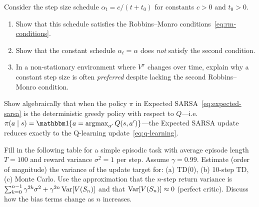 \begin{exercise}
\label{ex:rm-conditions}
Consider the step size schedule $\alpha_t = c/(t+t_0)$ for constants $c>0$ and $t_0>0$.
\begin{enumerate}[label=(\alph*)]
  \item Show that this schedule satisfies the Robbins--Monro conditions~\eqref{eq:rm-conditions}.
  \item Show that the constant schedule $\alpha_t = \alpha$ does \emph{not} satisfy the second condition.
  \item In a non-stationary environment where $V^\pi$ changes over time, explain why a constant step size is often \emph{preferred} despite lacking the second Robbins--Monro condition.
\end{enumerate}
\end{exercise}

\begin{exercise}
\label{ex:expected-sarsa-reduce}
Show algebraically that when the policy $\pi$ in Expected SARSA~\eqref{eq:expected-sarsa} is the deterministic greedy policy with respect to $Q$---i.e.\ $\pi(a\mid s) = \ind\{a = \argmax_{a'}Q(s,a')\}$---the Expected SARSA update reduces exactly to the Q-learning update~\eqref{eq:q-learning}.
\end{exercise}

\begin{exercise}
\label{ex:bias-variance-table}
Fill in the following table for a simple episodic task with average episode length $T=100$ and reward variance $\sigma^2=1$ per step.  Assume $\gamma=0.99$.  Estimate (order of magnitude) the variance of the update target for: (a) TD(0), (b) 10-step TD, (c) Monte Carlo.  Use the approximation that the $n$-step return variance is $\sum_{k=0}^{n-1}\gamma^{2k}\sigma^2 + \gamma^{2n}\operatorname{Var}[V(S_n)]$ and that $\operatorname{Var}[V(S_n)]\approx 0$ (perfect critic).  Discuss how the bias terms change as $n$ increases.
\end{exercise}
